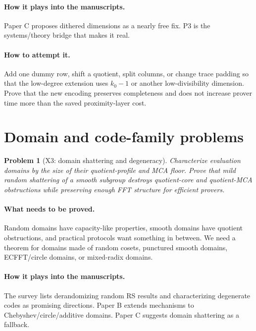 \documentclass[11pt]{article}
\newtheorem{problem}[theorem]{Problem}
\theoremstyle{definition}
\theoremstyle{remark}
\newcommand{\paperB}{Paper B}
\newcommand{\paperC}{Paper C}
\begin{document}
\paragraph{How it plays into the manuscripts.}  \paperC{} proposes dithered dimensions as a nearly free fix.  P3 is the systems/theory bridge that makes it real.

\paragraph{How to attempt it.}  Add one dummy row, shift a quotient, split columns, or change trace padding so that the low-degree extension uses $k_0-1$ or another low-divisibility dimension.  Prove that the new encoding preserves completeness and does not increase prover time more than the saved proximity-layer cost.

\section{Domain and code-family problems}

\begin{problem}[X3: domain shattering and degeneracy]
\label{prob:X3}
Characterize evaluation domains by the size of their quotient-profile and MCA floor.  Prove that mild random shattering of a smooth subgroup destroys quotient-core and quotient-MCA obstructions while preserving enough FFT structure for efficient provers.
\end{problem}

\paragraph{What needs to be proved.}  Random domains have capacity-like properties, smooth domains have quotient obstructions, and practical protocols want something in between.  We need a theorem for domains made of random cosets, punctured smooth domains, ECFFT/circle domains, or mixed-radix domains.

\paragraph{How it plays into the manuscripts.}  The survey lists derandomizing random RS results and characterizing degenerate codes as promising directions.  \paperB{} extends mechanisms to Chebyshev/circle/additive domains.  \paperC{} suggests domain shattering as a fallback.
\end{document}
